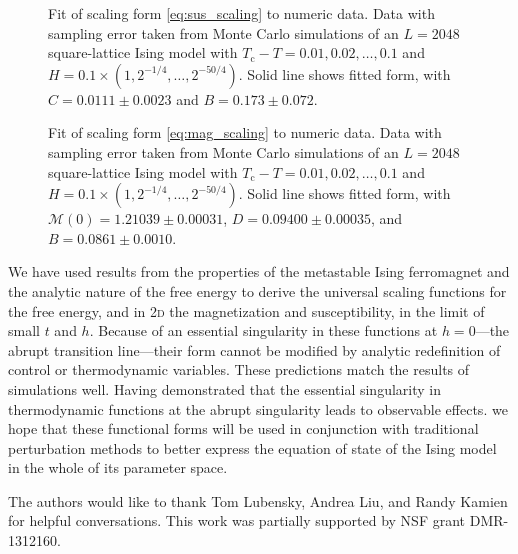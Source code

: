 \documentclass[aps,prl,preprint]{revtex4-1}
\def\c{\mathrm c}
\def\fM{\mathcal M}  %
\def\twodee{\textsc{2d} }
\begin{document}
\begin{figure}
  
  \caption{
    Fit of scaling form \eqref{eq:sus_scaling} to numeric data.  Data with
    sampling error taken from Monte Carlo simulations of an $L=2048$
    square-lattice Ising model with $T_\c-T=0.01,0.02,\ldots,0.1$ and
    $H=0.1\times(1,2^{-1/4},\ldots,2^{-50/4})$. Solid line shows fitted form,
    with $C=0.0111\pm0.0023$ and $B=0.173\pm0.072$.
  }
  \label{fig:sus}
\end{figure}

\begin{figure}
  
  \caption{
    Fit of scaling form \eqref{eq:mag_scaling} to numeric data. Data with
    sampling error taken from Monte Carlo simulations of an $L=2048$
    square-lattice Ising model with $T_\c-T=0.01,0.02,\ldots,0.1$ and
    $H=0.1\times(1,2^{-1/4},\ldots,2^{-50/4})$. Solid line shows fitted form,
    with $\fM(0)=1.21039\pm0.00031$,
    $D=0.09400\pm0.00035$, and $B=0.0861\pm0.0010$.
  }
  \label{fig:mag}
\end{figure}

We have used results from the properties of the metastable Ising ferromagnet
and the analytic nature of the free energy to derive the universal scaling
functions for the free energy, and in \twodee the magnetization and
susceptibility, in the limit of small $t$ and $h$. Because of an essential
singularity in these functions at $h=0$---the abrupt transition line---their
form cannot be modified by analytic redefinition of control or thermodynamic
variables. These predictions match the results of simulations well. Having
demonstrated that the essential singularity in thermodynamic functions at the
abrupt singularity leads to observable effects. we hope that these functional
forms will be used in conjunction with traditional perturbation methods to
better express the equation of state of the Ising model in the whole of its
parameter space.

\begin{acknowledgments}
  The authors would like to thank Tom Lubensky, Andrea Liu, and Randy Kamien
  for helpful conversations. This work was partially supported by NSF grant
  DMR-1312160.
\end{acknowledgments}


\end{document}
